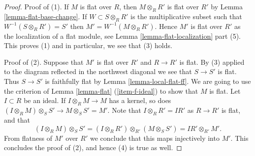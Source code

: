 \documentclass[10pt,a4paper]{amsart}
\theoremstyle{plain}
\theoremstyle{definition}
\theoremstyle{remark}
\numberwithin{equation}{subsection}
\begin{document}
\begin{proof}
Proof of (1). If $M$ is flat over $R$, then $M \otimes_R R'$
is flat over $R'$ by
Lemma \ref{lemma-flat-base-change}.
If $W \subset S \otimes_R R'$ is the multiplicative subset such that
$W^{-1}(S \otimes_R R') = S'$ then $M' = W^{-1}(M \otimes_R R')$.
Hence $M'$ is flat over $R'$ as the localization of a flat module, see
Lemma \ref{lemma-flat-localization} part (5). This proves (1) and in
particular, we see that (3) holds.

\medskip\noindent
Proof of (2). Suppose that $M'$ is flat over $R'$ and $R \to R'$ is flat.
By (3) applied to the diagram reflected in the northwest diagonal
we see that $S \to S'$ is flat. Thus $S \to S'$ is faithfully flat by
Lemma \ref{lemma-local-flat-ff}.
We are going to use the criterion of
Lemma \ref{lemma-flat} (\ref{item-f-ideal})
to show that $M$ is flat.
Let $I \subset R$ be an ideal. If $I \otimes_R M \to M$ has a kernel,
so does $(I \otimes_R M) \otimes_S S' \to M \otimes_S S' = M'$.
Note that $I \otimes_R R' = IR'$ as $R \to R'$ is flat, and that
$$
(I \otimes_R M) \otimes_S S' =
(I \otimes_R R') \otimes_{R'} (M \otimes_S S') =
IR' \otimes_{R'} M'.
$$
From flatness of $M'$ over $R'$
we conclude that this maps injectively into $M'$.
This concludes the proof of (2), and hence (4) is true as well.
\end{proof}
\end{document}
